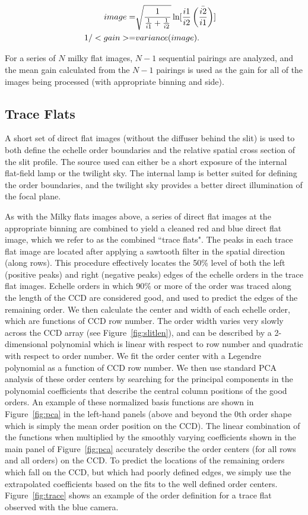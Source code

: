 \documentclass[12pt,preprint]{aastex}
\begin{document}
\begin{eqnarray}
image = & \sqrt{\frac{1}{\frac{1}{i1} + \frac{1}{i2}}} \, 
              {\rm ln}[\frac{i1}{i2} \, \bar{\left(\frac{i2}{i1}\right)}]  \cr
1 / <gain> = & variance(image) .
\end{eqnarray}

For a series of $N$ milky flat images, $N-1$ sequential pairings are analyzed,
and the mean gain calculated from the $N-1$ pairings is used as the gain 
for all of the images being processed (with appropriate binning and side).

\subsection{Trace Flats}
\label{sec:tflat}

A short set of direct flat images (without the diffuser behind the slit) is
used to both define the echelle order boundaries and the relative spatial
cross section of the slit profile.  The source used can either be a short
exposure of the internal flat-field lamp or the twilight sky.  
The internal lamp is better suited for defining the order boundaries, and
the twilight sky provides a better direct illumination of the focal plane.

As with the Milky flats images above, a series of direct flat images
at the appropriate binning are combined to yield a cleaned red and blue
direct flat image, which we refer to as the combined ``trace flats".
The peaks in each trace flat image are located after applying a sawtooth filter
in the spatial direction (along rows).  This procedure effectively locates
the 50\% level of both the left (positive peaks) and right (negative peaks)
edges of the echelle orders in the trace flat images.  Echelle orders in which
90\% or more of the order was traced along the length of the CCD are considered good, and used to predict the edges of the remaining order.  
We then calculate the center and width of each echelle order, which are
functions of CCD row number.
The order width varies very slowly across the
CCD array (see Figure~\ref{fig:slitlen}), and can be described by a 2-dimensional
polynomial which is linear with respect to row number and quadratic with 
respect to order number.  
We fit the order center with a Legendre polynomial as a function
of CCD row number. We then use standard
PCA analysis \citep{PCA} of these order centers 
by searching for the principal components in the 
polynomial coefficients that describe the central column positions of the 
good orders.  
An example of these normalized basis functions are shown in Figure~\ref{fig:pca} 
in the 
left-hand panels (above and beyond the 0th order shape which is simply the 
mean order position on the CCD).  The linear combination of the functions when
multiplied by the smoothly varying coefficients shown in the main panel of
Figure~\ref{fig:pca}
accurately describe the order centers (for all rows and all orders) on the CCD.
To predict the locations of the remaining orders which fall on the CCD, 
but which had poorly defined edges, we simply use the extrapolated
coefficients based on the fits to the well defined order centers.
Figure~\ref{fig:trace} shows an example of the order definition for
a trace flat observed with the blue camera.  
\end{document}
